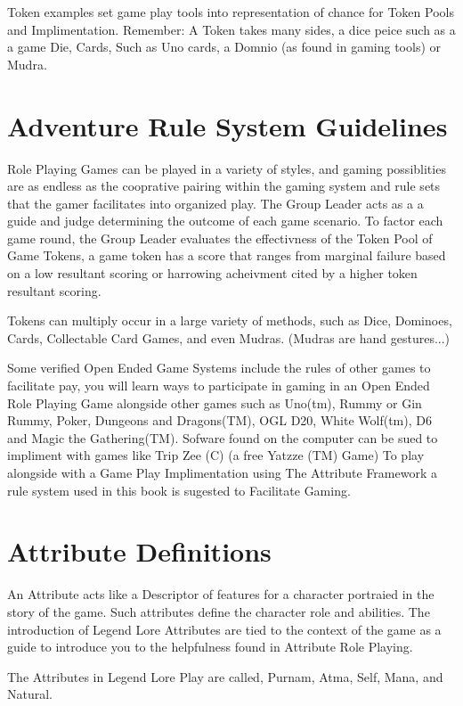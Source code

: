 \documentclass{article}
\begin{document}
Token examples set game play tools into representation of chance for Token Pools and Implimentation. Remember: A Token takes many sides, a dice peice such as a a game Die, Cards, Such as Uno cards, a Domnio (as found in gaming tools) or Mudra.

\section{Adventure Rule System Guidelines}

Role Playing Games can be played in a variety of styles, and gaming possiblities are as endless as the cooprative pairing within the gaming system and rule sets that the gamer facilitates into organized play. The Group Leader acts as a a guide and judge determining the outcome of each game scenario. To factor each game round, the Group Leader evaluates the effectivness of the Token Pool of Game Tokens, a game token has a score that ranges from marginal failure based on a low resultant scoring or harrowing acheivment cited by a higher token resultant scoring.

Tokens can multiply occur in a large variety of methods, such as Dice, Dominoes, Cards, Collectable Card Games, and even Mudras. (Mudras are hand gestures...)

Some verified Open Ended Game Systems include the rules of other games to facilitate pay, you will learn ways to participate in gaming in an Open Ended Role Playing Game alongside other games such as Uno(tm), Rummy or Gin Rummy, Poker, Dungeons and Dragons(TM), OGL D20, White Wolf(tm), D6 and Magic the Gathering(TM). Sofware found on the computer can be sued to impliment with games like Trip Zee (C) (a free Yatzze (TM) Game) To play alongside with a Game Play Implimentation using The Attribute Framework a rule system used in this book is sugested to Facilitate Gaming.

\section{Attribute Definitions}
An Attribute acts like a Descriptor of features for a character portraied in the story of the game. Such attributes define the character role and abilities. The introduction of Legend Lore Attributes are tied to the context of the game as a guide to introduce you to the helpfulness found in Attribute Role Playing.

The Attributes in Legend Lore Play are called, Purnam, Atma, Self, Mana, and Natural.
\end{document}
